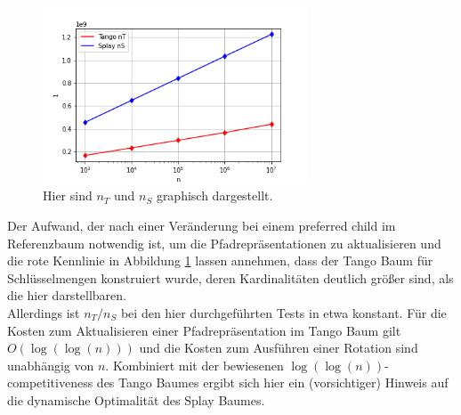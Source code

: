 \documentclass[a4paper,12pt]{article}
\begin{document}
\begin{figure}[H]
	\centering
	\includegraphics[width=0.7\textwidth]{Medien/laufzeittest/diagramm/nT}
	\caption{Hier sind $n_T$ und $n_S$ graphisch dargestellt.}
	\label{fig:nT}
\end{figure}
\noindent Der Aufwand, der nach einer Veränderung bei einem preferred child im Referenzbaum notwendig ist, um die Pfadrepräsentationen zu aktualisieren und die rote Kennlinie in Abbildung \ref{fig:nT} lassen annehmen, dass der Tango Baum für Schlüsselmengen konstruiert wurde, deren Kardinalitäten deutlich größer sind, als die hier darstellbaren. \\
 Allerdings ist $n_T/ n_S$ bei den hier durchgeführten Tests in etwa konstant. Für die Kosten zum  Aktualisieren einer Pfadrepräsentation im Tango Baum gilt $O\left(\log\left(\log\left(n\right)\right)\right)$ und die Kosten zum Ausführen einer Rotation sind unabhängig von $n$. Kombiniert mit der bewiesenen $\log\left(\log\left(n\right)\right)$-competitiveness des Tango Baumes ergibt sich hier ein (vorsichtiger) Hinweis auf die dynamische Optimalität des Splay Baumes.
\end{document}

